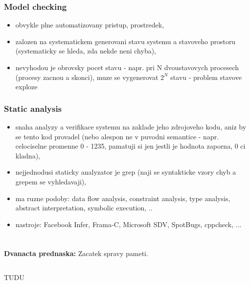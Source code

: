 \documentclass[a4paper, 11pt]{article}
\begin{document}
\subsubsection{Model checking}
\begin{itemize}
    \item obvykle plne automatizovany pristup, prostredek,
    \item zalozen na systematickem generovani stavu systemu a stavoveho prostoru (systematicky se hleda, zda nekde neni chyba),
    \item nevyhodou je obrovsky pocet stavu - napr. pri N dvoustavovych procesech (procesy zacnou a skonci), muze se vygenerovat $2^N$ stavu - problem stavove exploze \\
\end{itemize}

\subsubsection{Static analysis}
\begin{itemize}
    \item snaha analyzy a verifikace systemu na zaklade jeho zdrojoveho kodu, aniz by se tento kod provadel (nebo alespon ne v puvodni semantice - napr. celociselne promenne 0 - 1235, pamatuji si jen jestli je hodnota zaporna, 0 ci kladna),
    \item nejjednodusi staticky analyzator je grep (naji se syntakticke vzory chyb a grepem se vyhledavaji),
    \item ma ruzne podoby: data flow analysis, constraint analysis, type analysis, abstract interpretation, symbolic execution, ..
    \item nastroje: Facebook Infer, Frama-C, Microsoft SDV, SpotBugs, cppcheck, ... \\
\end{itemize}

\newpage

\section{}
\textbf{Dvanacta prednaska:} Zacatek spravy pameti.
\subsection{}
TUDU
\end{document}

